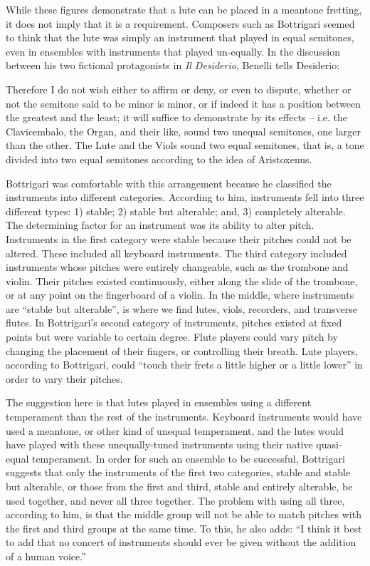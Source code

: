 While these figures demonstrate that a lute can be placed in a meantone fretting,
it does not imply that it is a requirement.  Composers such as Bottrigari seemed 
to think that the lute was simply an instrument that played in
equal semitones, even in ensembles with instruments that played un-equally.
In the discussion between his two fictional protagonists in \textit{Il Desiderio}, 
Benelli tells Desiderio:

\begin{blocks}
Therefore I do not wish either to affirm or deny, or even to dispute, whether or not 
the semitone said to be minor is minor, or if indeed it has a position between the 
greatest and the least; it will suffice to demonstrate by its effects -- i.e. the
Clavicembalo, the Organ, and their like, sound two unequal semitones, one larger 
than the other. The Lute and the Viols sound two equal semitones, that is, a tone
divided into two equal semitones according to the idea of Aristoxenus. \autocite[17]{HB:1}
\end{blocks}

Bottrigari was comfortable with this arrangement because he classified the
instruments into different categories.  According to him, instruments fell into
three different types: 1) stable; 2) stable but alterable; and, 3) completely
alterable.  The determining factor for an instrument was its ability to alter
pitch.  Instruments in the first category were stable because their pitches
could not be altered.  These included all keyboard instruments.  The third
category included instruments whose pitches were entirely changeable, such as
the trombone and violin.  Their pitches existed continuously, either along the
slide of the trombone, or at any point on the fingerboard of a violin. In the
middle, where instruments are ``stable but alterable'', is where we find lutes,
viols, recorders, and transverse flutes. In Bottrigari's second category of
instruments,  pitches existed at fixed points but were variable to certain
degree.  Flute players could vary pitch by changing the placement of their
fingers, or controlling their breath.  Lute players, according to Bottrigari,
could ``touch their frets a little higher or a little lower'' in order to
vary their pitches. \autocite[15]{HB:1}

The suggestion here is that lutes played in ensembles using  a different
temperament than the rest of the instruments.  Keyboard instruments would have
used a meantone, or other kind of unequal temperament, and the lutes would have
played with these unequally-tuned instruments using their native quasi-equal
temperament.  In order for such an ensemble to be successful, Bottrigari
suggests that only the instruments of the first two categories, stable and
stable but alterable, or those from the first and third, stable and entirely
alterable, be used together, and never all three together.  The problem with
using all three, according to him, is that the middle group will not be able to
match pitches with the first and third groups at the same time. To this, he also
adds: ``I think it best to add that no concert of instruments should ever be
given without the addition of a human voice.''  \autocite[23]{HB:1}

